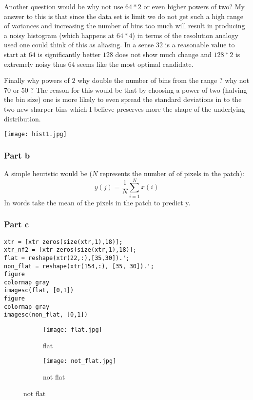\documentclass[11pt]{article}
\begin{document}
 Another question would be why not use $64*2$ or even higher powers of two? My answer to this is that since the data set is limit we do not get such a high range of variances and increasing the number of bins too much will result in producing a noisy histogram (which happens at $64*4$) in terms of the resolution analogy used one could think of this as aliasing. In a sense $32$ is a reasonable value to start at $64$ is significantly better $128$ does not show much change and $128*2$ is extremely noisy thus $64$ seems like the most optimal candidate.
 
 Finally why powers of $2$ why double the number of bins from the range ? why not 70 or 50 ? The reason for this would be that by choosing a power of two (halving the bin size) one is more likely to even spread the standard deviations in to the two new sharper bins which I believe preserves more the shape of the underlying distribution.
 \begin{center}
 \texttt{[image: hist1.jpg]}
 \end{center}

\subsubsection{Part b }

A simple heuristic  would be ($N$ represents the number of of pixels in the patch):
\[
y(j) = \frac{1}{N} \sum_{i = 1}^{N }x(i)
\]
In words take the mean of the pixels in the patch to predict y.
\subsubsection{Part c}
\begin{lstlisting}
xtr = [xtr zeros(size(xtr,1),18)];
xtr_nf2 = [xtr zeros(size(xtr,1),18)];
flat = reshape(xtr(22,:),[35,30]).';
non_flat = reshape(xtr(154,:), [35, 30]).';
figure
colormap gray
imagesc(flat, [0,1])
figure
colormap gray
imagesc(non_flat, [0,1])
\end{lstlisting}

\begin{figure}[h]
\centering
\begin{subfigure}{.5\textwidth}
\centering
\caption{flat}
\texttt{[image: flat.jpg]}
\end{subfigure}%
\begin{subfigure}{.5 \textwidth}
\centering
\caption{not flat}
\texttt{[image: not\_flat.jpg]}
\end{subfigure}
\end{figure}
\end{document}

